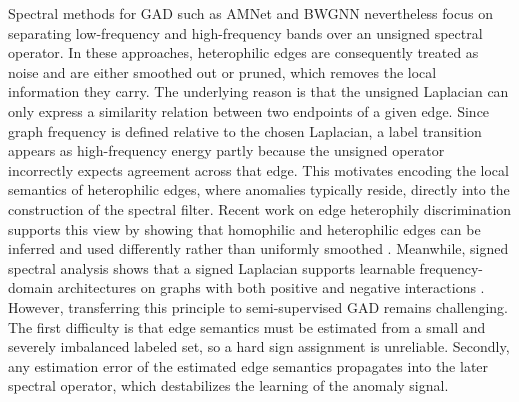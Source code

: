 Spectral methods for GAD such as AMNet \citep{AMNet} and BWGNN \citep{BWGNN} nevertheless focus on separating low-frequency and high-frequency bands over an unsigned spectral operator.
In these approaches, heterophilic edges are consequently treated as noise and are either smoothed out or pruned, which removes the local information they carry.
The underlying reason is that the unsigned Laplacian can only express a similarity relation between two endpoints of a given edge.
Since graph frequency is defined relative to the chosen Laplacian, a label transition appears as high-frequency energy partly because the unsigned operator incorrectly expects agreement across that edge.
This motivates encoding the local semantics of heterophilic edges, where anomalies typically reside, directly into the construction of the spectral filter.
Recent work on edge heterophily discrimination supports this view by showing that homophilic and heterophilic edges can be inferred and used differently rather than uniformly smoothed \citep{GREET,H2-FDetector}.
Meanwhile, signed spectral analysis shows that a signed Laplacian supports learnable frequency-domain architectures on graphs with both positive and negative interactions \citep{KunegisSigned,MSGNN}.
However, transferring this principle to semi-supervised GAD remains challenging.
The first difficulty is that edge semantics must be estimated from a small and severely
imbalanced labeled set, so a hard sign assignment is unreliable.
Secondly, any estimation error of the estimated edge semantics propagates into the later spectral operator, which destabilizes the learning of the anomaly signal.

